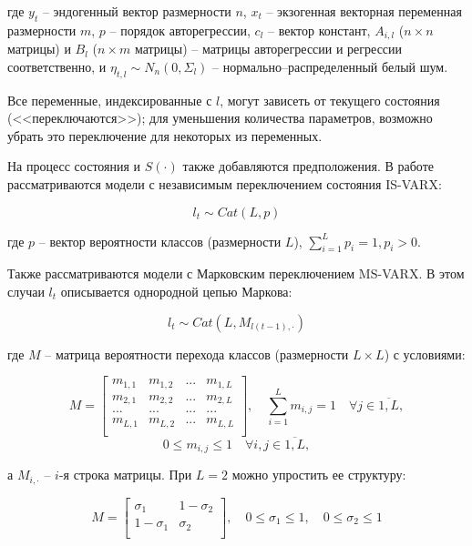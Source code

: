 \documentclass[a4paper,14pt]{extreport}
\begin{document}
где 
$y_t$ -- эндогенный вектор размерности $n$, 
$x_{t}$ -- экзогенная векторная переменная размерности $m$,
$p$ -- порядок авторегрессии, 
$c_{l}$ -- вектор констант,
$A_{i,l}$ ($n \times n$ матрицы) и $B_{l}$ ($n \times m$ матрицы) -- матрицы авторегрессии и регрессии соответственно,
и $\eta_{t, l} \sim N_n(0, \Sigma_{l}) $ -- нормально–распределенный белый шум.

Все переменные, индексированные с $l$, могут зависеть от текущего состояния (<<переключаются>>); для уменьшения количества параметров, возможно убрать это переключение для некоторых из переменных.


На процесс состояния и $S(\cdot)$ также добавляются предположения. В работе рассматриваются модели с независимым переключением состояния IS-VARX:

\[ 
	l_t \sim \mathit{Cat}(L, p)
\]

где $p$ -- вектор вероятности классов (размерности $L$), $\sum_{i=1}^{L}{p_i} = 1, p_i > 0$.

Также рассматриваются модели с Марковским переключением MS-VARX. 
В этом случаи $l_t$ описывается однородной цепью Маркова:

\[
	l_t \sim \mathit{Cat}(L, M_{l(t-1), \cdot})
\]

где $M$ -- матрица вероятности перехода классов (размерности $L \times L$) с условиями:

\[
	M=
	\left[ {\begin{array}{cccc}
					m_{1,1} & m_{1,2} & ... & m_{1,L} \\
					m_{2,1} & m_{2,2} & ... & m_{2,L} \\
					...     & ...     & ... & ...     \\
					m_{L,1} & m_{L,2} & ... & m_{L,L} \\
				\end{array} } \right]
	, \quad
	\sum_{i=1}^{L} m_{i,j} = 1 \quad \forall j \in \overline{1,L}
	,
\]
\[
	0 \le m_{i,j} \le 1 \quad \forall i, j \in \overline{1,L},
\]

а $M_{i, \cdot}$ -- $i$-я строка матрицы. При $L=2$ можно упростить ее структуру:

\[
	M=
	\left[ {\begin{array}{cc}
					\sigma_{1}   & 1-\sigma_{2} \\
					1-\sigma_{1} & \sigma_{2}   \\
				\end{array} } \right]
	, \quad 
	0 \le \sigma_{1} \le 1
	, \quad 
	0 \le \sigma_{2} \le 1
\]
\end{document}
